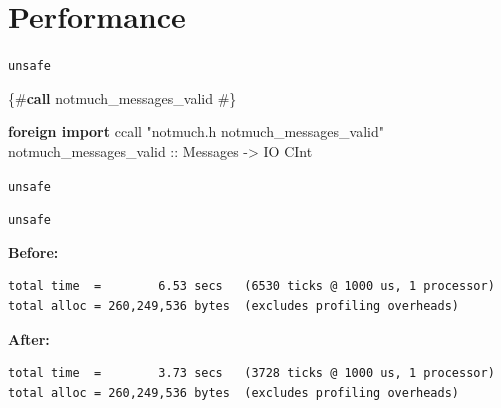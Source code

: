 \documentclass[ignorenonframetext,aspectratio=169]{beamer}
\newenvironment{Shaded}{}{}
\newcommand{\KeywordTok}[1]{\textcolor[rgb]{0.00,0.44,0.13}{\textbf{{#1}}}}
\newcommand{\DataTypeTok}[1]{\textcolor[rgb]{0.56,0.13,0.00}{{#1}}}
\newcommand{\StringTok}[1]{\textcolor[rgb]{0.25,0.44,0.63}{{#1}}}
\newcommand{\OtherTok}[1]{\textcolor[rgb]{0.00,0.44,0.13}{{#1}}}
\newcommand{\NormalTok}[1]{{#1}}
\newcommand\greyuline{\bgroup\markoverwith
    {\textcolor{lightgray}{\rule[-0.5ex]{2pt}{0.4pt}}}\ULon}
\begin{document}
\section{Performance}\label{performance}

\begin{frame}[fragile]{\texttt{unsafe}}

\begin{Shaded}
\begin{Highlighting}[]
\StringTok{\{#}\KeywordTok{call}        \StringTok{notmuch_messages_valid #\}}



\KeywordTok{foreign import} \NormalTok{ccall}        \StringTok{"notmuch.h notmuch_messages_valid"}
\OtherTok{  notmuch_messages_valid ::} \DataTypeTok{Messages} \OtherTok{->} \DataTypeTok{IO} \DataTypeTok{CInt}
\end{Highlighting}
\end{Shaded}

\end{frame}

\begin{frame}[fragile]{\texttt{unsafe}}

\begin{Shaded}
\end{Shaded}

\end{frame}

\begin{frame}[fragile]{\texttt{unsafe}}

{\bf Before:}

\begin{verbatim}
total time  =        6.53 secs   (6530 ticks @ 1000 us, 1 processor)
total alloc = 260,249,536 bytes  (excludes profiling overheads)
\end{verbatim}

{\bf After:}

\begin{verbatim}
total time  =        3.73 secs   (3728 ticks @ 1000 us, 1 processor)
total alloc = 260,249,536 bytes  (excludes profiling overheads)
\end{verbatim}

\end{frame}
\end{document}
